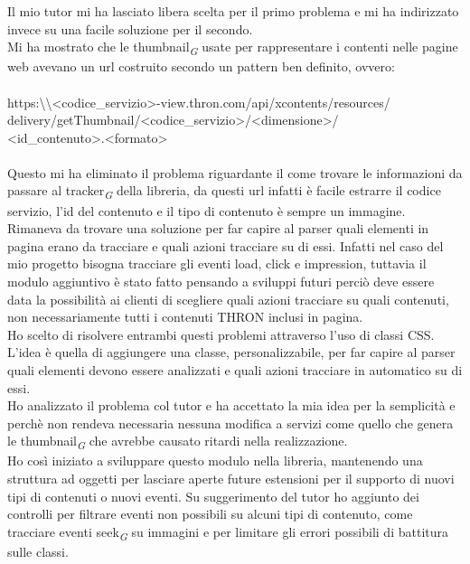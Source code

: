 \documentclass[a4paper, 12pt, twoside, openright]{book}
\newcommand{\gloss}[1]{#1\textsubscript{\textit{\tiny{G}}}}
\begin{document}
Il mio tutor mi ha lasciato libera scelta per il primo problema e mi ha indirizzato invece su una facile soluzione per il secondo.\\
Mi ha mostrato che le \gloss{thumbnail} usate per rappresentare i contenti nelle pagine web avevano un url costruito secondo un pattern ben definito, ovvero:\\ \\
https:\textbackslash\textbackslash<codice\_servizio>-view.thron.com/api/xcontents/resources/\\
delivery/getThumbnail/<codice\_servizio>/<dimensione>/\\
<id\_contenuto>.<formato>
\\ \\
Questo mi ha eliminato il problema riguardante il come trovare le informazioni da passare al \gloss{tracker} della libreria, da questi url infatti è facile estrarre il codice servizio, l'id del contenuto e il tipo di contenuto è sempre un immagine.\\
Rimaneva da trovare una soluzione per far capire al parser quali elementi in pagina erano da tracciare e quali azioni tracciare su di essi. Infatti nel caso del mio progetto bisogna tracciare gli eventi load, click e impression, tuttavia il modulo aggiuntivo è stato fatto pensando a sviluppi futuri perciò deve essere data la possibilità ai clienti di scegliere quali azioni tracciare su quali contenuti, non necessariamente tutti i contenuti THRON inclusi in pagina.\\
Ho scelto di risolvere entrambi questi problemi attraverso l'uso di classi CSS. L'idea è quella di aggiungere una classe, personalizzabile, per far capire al parser quali elementi devono essere analizzati e quali azioni tracciare in automatico su di essi.\\
Ho analizzato il problema col tutor e ha accettato la mia idea per la semplicità e perchè non rendeva necessaria nessuna modifica a servizi come quello che genera le \gloss{thumbnail} che avrebbe causato ritardi nella realizzazione.\\
Ho così iniziato a sviluppare questo modulo nella libreria, mantenendo una struttura ad oggetti per lasciare aperte future estensioni per il supporto di nuovi tipi di contenuti o nuovi eventi. Su suggerimento del tutor ho aggiunto dei controlli per filtrare eventi non possibili su alcuni tipi di contenuto, come tracciare eventi \gloss{seek} su immagini e per limitare gli errori possibili di battitura sulle classi.\\
\end{document}
